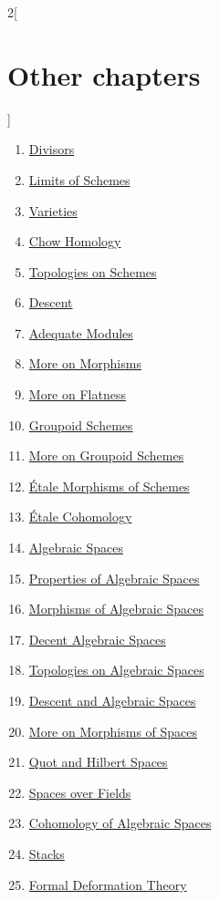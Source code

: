 \begin{multicols}{2}[\section{Other chapters}]
\begin{enumerate}
\item \hyperref[divisors-section-phantom]{Divisors}
\item \hyperref[limits-section-phantom]{Limits of Schemes}
\item \hyperref[varieties-section-phantom]{Varieties}
\item \hyperref[chow-section-phantom]{Chow Homology}
\item \hyperref[topologies-section-phantom]{Topologies on Schemes}
\item \hyperref[descent-section-phantom]{Descent}
\item \hyperref[adequate-section-phantom]{Adequate Modules}
\item \hyperref[more-morphisms-section-phantom]{More on Morphisms}
\item \hyperref[flat-section-phantom]{More on Flatness}
\item \hyperref[groupoids-section-phantom]{Groupoid Schemes}
\item \hyperref[more-groupoids-section-phantom]{More on Groupoid Schemes}
\item \hyperref[etale-section-phantom]{\'Etale Morphisms of Schemes}
\item \hyperref[etale-cohomology-section-phantom]{\'Etale Cohomology}
\item \hyperref[spaces-section-phantom]{Algebraic Spaces}
\item \hyperref[spaces-properties-section-phantom]{Properties of Algebraic Spaces}
\item \hyperref[spaces-morphisms-section-phantom]{Morphisms of Algebraic Spaces}
\item \hyperref[decent-spaces-section-phantom]{Decent Algebraic Spaces}
\item \hyperref[spaces-topologies-section-phantom]{Topologies on Algebraic Spaces}
\item \hyperref[spaces-descent-section-phantom]{Descent and Algebraic Spaces}
\item \hyperref[spaces-more-morphisms-section-phantom]{More on Morphisms of Spaces}
\item \hyperref[quot-section-phantom]{Quot and Hilbert Spaces}
\item \hyperref[spaces-over-fields-section-phantom]{Spaces over Fields}
\item \hyperref[spaces-cohomology-section-phantom]{Cohomology of Algebraic Spaces}
\item \hyperref[stacks-section-phantom]{Stacks}
\item \hyperref[formal-defos-section-phantom]{Formal Deformation Theory}

\end{enumerate}
\end{multicols}
